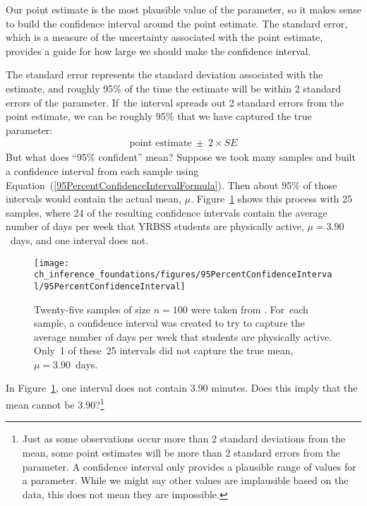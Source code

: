 Our point estimate is the most plausible value of the parameter, so it makes sense to build the confidence interval around the point estimate. The standard error, which is a measure of the uncertainty associated with the point estimate, provides a guide for how large we should make the confidence interval.

The standard error represents the standard deviation associated with the estimate, and roughly 95\% of the time the estimate will be within 2 standard errors of the parameter. If~the interval spreads out 2 standard errors from the point estimate, we can be roughly 95\%  that we have captured the true parameter:
\begin{eqnarray}
\text{point estimate}\ \pm\ 2\times SE
\label{95PercentConfidenceIntervalFormula}
\end{eqnarray}
But what does ``95\% confident'' mean? Suppose we took many samples and built a confidence interval from each sample using Equation~(\ref{95PercentConfidenceIntervalFormula}). Then about 95\% of those intervals would contain the actual mean, $\mu$. Figure~\ref{95PercentConfidenceInterval} shows this process with 25 samples, where 24 of the resulting confidence intervals contain the average number of days per week that YRBSS students are physically active, $\mu=3.90$~days, and one interval does not.

\begin{figure}[hht]
   \centering
   \texttt{[image: ch\_inference\_foundations/figures/95PercentConfidenceInterval/95PercentConfidenceInterval]}
   \caption{Twenty-five samples of size $n=100$ were taken from . For~each sample, a confidence interval was created to try to capture the average number of days per week that students are physically active. Only~1 of these~25 intervals did not capture the true mean, $\mu = 3.90$~days.}
   \label{95PercentConfidenceInterval}
\end{figure}

\begin{exercise}
In Figure~\ref{95PercentConfidenceInterval}, one interval does not contain 3.90 minutes. Does this imply that the mean cannot be 3.90?\footnote{Just as some observations occur more than 2 standard deviations from the mean, some point estimates will be more than 2 standard errors from the parameter. A confidence interval only provides a plausible range of values for a parameter. While we might say other values are implausible based on the data, this does not mean they are impossible.}
\end{exercise}

